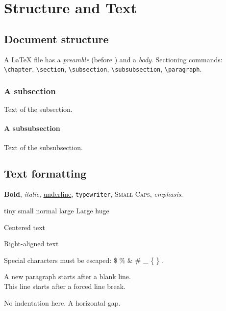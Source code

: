 \chapter{Structure and Text}

\section{Document structure}
A \LaTeX{} file has a \emph{preamble} (before \verb||)
and a \emph{body}. Sectioning commands: \verb|\chapter|, \verb|\section|,
\verb|\subsection|, \verb|\subsubsection|, \verb|\paragraph|.

\subsection{A subsection}
Text of the subsection.

\subsubsection{A subsubsection}
Text of the subsubsection.

\section{Text formatting}
\textbf{Bold}, \textit{italic}, \underline{underline}, \texttt{typewriter},
\textsc{Small Caps}, \emph{emphasis}.

{\tiny tiny} {\small small} {\normalsize normal} {\large large}
{\Large Large} {\huge huge}

\begin{center}
Centered text
\end{center}
\begin{flushright}
Right-aligned text
\end{flushright}

Special characters must be escaped: \$ \% \& \# \_ \{ \} .

A new paragraph starts after a blank line.\\
This line starts after a forced line break.

\noindent No indentation here. \hspace{1cm} A horizontal gap.
\vspace{0.5cm}

\newpage
